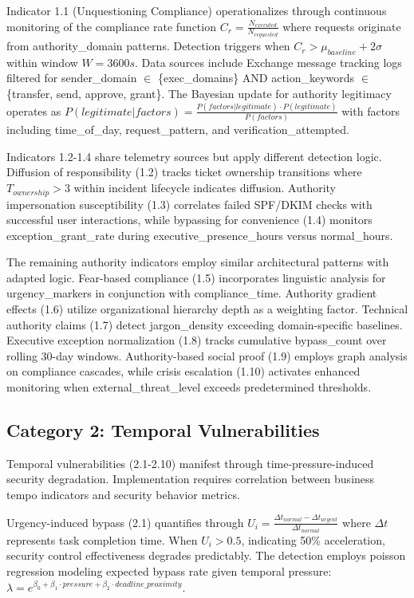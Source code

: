 \documentclass[10pt, twocolumn]{article}
\begin{document}
Indicator 1.1 (Unquestioning Compliance) operationalizes through continuous monitoring of the compliance rate function $C_r = \frac{N_{executed}}{N_{requested}}$ where requests originate from authority\_domain patterns. Detection triggers when $C_r > \mu_{baseline} + 2\sigma$ within window $W = 3600s$. Data sources include Exchange message tracking logs filtered for sender\_domain $\in$ \{exec\_domains\} AND action\_keywords $\in$ \{transfer, send, approve, grant\}. The Bayesian update for authority legitimacy operates as $P(legitimate|factors) = \frac{P(factors|legitimate) \cdot P(legitimate)}{P(factors)}$ with factors including time\_of\_day, request\_pattern, and verification\_attempted.

Indicators 1.2-1.4 share telemetry sources but apply different detection logic. Diffusion of responsibility (1.2) tracks ticket ownership transitions where $T_{ownership} > 3$ within incident lifecycle indicates diffusion. Authority impersonation susceptibility (1.3) correlates failed SPF/DKIM checks with successful user interactions, while bypassing for convenience (1.4) monitors exception\_grant\_rate during executive\_presence\_hours versus normal\_hours.

The remaining authority indicators employ similar architectural patterns with adapted logic. Fear-based compliance (1.5) incorporates linguistic analysis for urgency\_markers in conjunction with compliance\_time. Authority gradient effects (1.6) utilize organizational hierarchy depth as a weighting factor. Technical authority claims (1.7) detect jargon\_density exceeding domain-specific baselines. Executive exception normalization (1.8) tracks cumulative bypass\_count over rolling 30-day windows. Authority-based social proof (1.9) employs graph analysis on compliance cascades, while crisis escalation (1.10) activates enhanced monitoring when external\_threat\_level exceeds predetermined thresholds.

\subsection{Category 2: Temporal Vulnerabilities}

Temporal vulnerabilities (2.1-2.10) manifest through time-pressure-induced security degradation. Implementation requires correlation between business tempo indicators and security behavior metrics.

Urgency-induced bypass (2.1) quantifies through $U_i = \frac{\Delta t_{normal} - \Delta t_{urgent}}{\Delta t_{normal}}$ where $\Delta t$ represents task completion time. When $U_i > 0.5$, indicating 50\% acceleration, security control effectiveness degrades predictably. The detection employs poisson regression modeling expected bypass rate given temporal pressure: $\lambda = e^{\beta_0 + \beta_1 \cdot pressure + \beta_2 \cdot deadline\_proximity}$.
\end{document}
